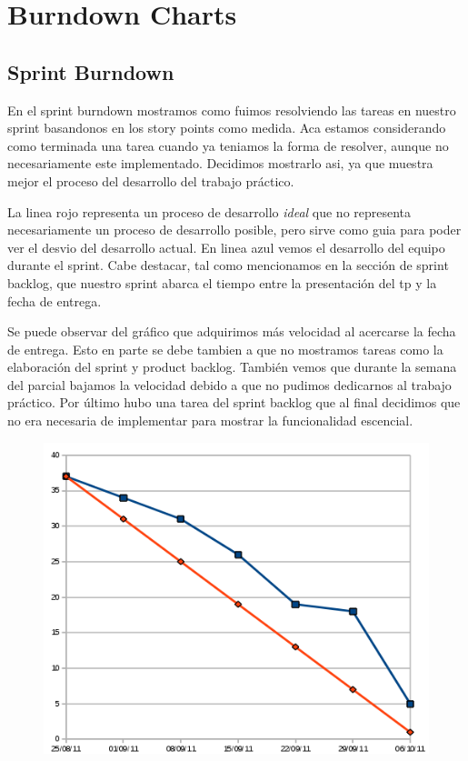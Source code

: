 \section{Burndown Charts}
\subsection*{Sprint Burndown}

En el sprint burndown mostramos como fuimos resolviendo las tareas en nuestro sprint basandonos en los story points como medida.
Aca estamos considerando como terminada una tarea cuando ya teniamos la forma de resolver, aunque no necesariamente este implementado.
Decidimos mostrarlo asi, ya que muestra mejor el proceso del desarrollo del trabajo pr\'actico.

La linea rojo representa un proceso de desarrollo \emph{ideal} que no representa necesariamente un proceso de desarrollo posible, pero
sirve como guia para poder ver el desvio del desarrollo actual.
En linea azul vemos el desarrollo del equipo durante el sprint. Cabe destacar, tal como mencionamos en la secci\'on de sprint backlog, que
nuestro sprint abarca el tiempo entre la presentaci\'on del tp y la fecha de entrega.

Se puede observar del gr\'afico que adquirimos m\'as velocidad al acercarse la fecha de entrega. Esto en parte se debe tambien a que no mostramos
tareas como la elaboraci\'on del sprint y product backlog. Tambi\'en vemos que durante la semana del parcial bajamos la velocidad
debido a que no pudimos dedicarnos al trabajo pr\'actico. Por \'ultimo hubo una tarea del sprint backlog que al final decidimos que
no era necesaria de implementar para mostrar la funcionalidad escencial.

\begin{figure}[H]
\begin{center}
 \includegraphics[scale=0.6]{burn3.png}
\end{center}
\end{figure}
\newpage
